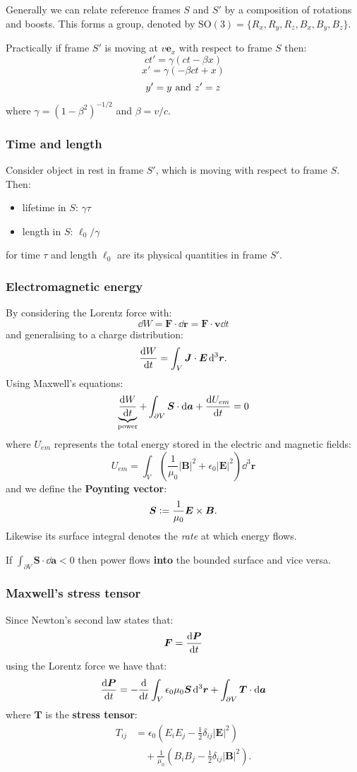 \documentclass{article}
\newcommand{\deq}{\vcentcolon=}
\newcommand{\vc}[1]{\boldsymbol{#1}}
\begin{document}
\begin{multicols*}{3}
Generally we can relate reference frames $S$ and $S'$
by a composition of rotations and boosts. This forms a group,
denoted by $\text{SO}(3)=\{R_x,R_y,R_z,B_x,B_y,B_z\}$.

Practically if frame $S'$ is moving at $v\vc{e}_x$
with respect to frame $S$ then:
$$ct'=\gamma(ct-\beta x)$$
$$x'=\gamma(-\beta ct+x)$$
$$y'=y\hspace{0.05in}\text{and}\hspace{0.05in}z'=z$$
where $\gamma=(1-\beta^2)^{-1/2}$ and $\beta=v/c$.

\subsubsection*{Time and length}
Consider object in rest in frame $S'$, which is moving
with respect to frame $S$. Then:
\begin{itemize}
    \item lifetime in $S$: $\gamma\tau$
    \item length in $S$: $\ell_0/\gamma$
\end{itemize}
for time $\tau$ and length $\ell_0$ are its
physical quantities in frame $S'$.

\subsubsection*{Electromagnetic energy}
By considering the Lorentz force with:
$$\dd W=\vc{F}\cdot\dd\vc{r}=\vc{F}\cdot\vc{v}\dd t$$
and generalising to a charge distribution:
$$\dv{W}{t}=\int_V\vc{J}\cdot\vc{E}\hspace{0.02in}\dd^3\vc{r}.$$
Using Maxwell's equations:
$$\underbrace{\dv{W}{t}}_\text{power}
+\int_{\partial V}\vc{S}\cdot\dd\vc{a}+\dv{U_{em}}{t}=0$$
where $U_{em}$ represents the total energy stored in the
electric and magnetic fields:
$$U_{em}=\int_{V}\left(\frac{1}{\mu_0}|\vc{B}|^2
+\epsilon_0|\vc{E}|^2\right)\dd^3\vc{r}$$
and we define the \textbf{Poynting vector}:
$$\vc{S}\deq\frac{1}{\mu_0}\vc{E}\times\vc{B}.$$
Likewise its surface integral denotes the \textit{rate}
at which energy flows.

If $\displaystyle\int_{\partial V}\vc{S}\cdot\dd\vc{a}<0$
then power flows \textbf{into} the bounded surface and vice versa.

\subsubsection*{Maxwell's stress tensor}
Since Newton's second law states that:
$$\vc{F}=\dv{\vc{P}}{t}$$
using the Lorentz force we have that:
$$\dv{\vc{P}}{t}
=-\dv{t}\int_V\epsilon_0
\mu_0\vc{S}\hspace{0.02in}\dd^3\vc{r}
+\int_{\partial V}\vc{T}\cdot\dd\vc{a}$$
where $\vc{T}$ is the \textbf{stress tensor}:
\begin{align*}
    T_{ij}&=\epsilon_0\left(E_i E_j-\frac{1}{2}
    \delta_{ij}|\vc{E}|^2\right) \\
    &\quad+\frac{1}{\mu_0}\left(B_i B_j-\frac{1}{2}
    \delta_{ij}|\vc{B}|^2\right).
\end{align*}


\end{multicols*}
\end{document}
